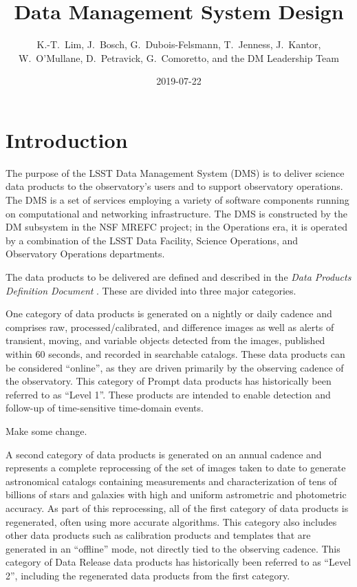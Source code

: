 \documentclass[DM,toc]{lsstdoc}
\title{Data Management System Design}
\author{
  K.-T.~Lim,
  J.~Bosch,
  G.~Dubois-Felsmann,
  T.~Jenness,
  J.~Kantor,
  W.~O'Mullane,
  D.~Petravick,
  G.~Comoretto,
  and
  the DM Leadership Team}
\date{2019-07-22}
\begin{document}
\maketitle

\section{Introduction}\label{introduction}

The purpose of the LSST Data Management System (DMS) is to deliver science data
products to the observatory's users and to support observatory operations.  The
DMS is a set of services employing a variety of software components running on
computational and networking infrastructure.  The DMS is constructed by the DM
subsystem in the NSF MREFC project; in the Operations era, it is operated by a
combination of the LSST Data Facility, Science Operations, and Observatory
Operations departments.

The data products to be delivered are defined and described in the \textit{Data
Products Definition Document} . These are divided into three
major categories.

One category of data products is generated on a nightly or daily cadence
and comprises raw, processed/calibrated, and difference images as well as alerts
of transient, moving, and variable objects detected from the images,
published within 60 seconds, and recorded in searchable catalogs. These
data products can be considered ``online'', as they are driven primarily
by the observing cadence of the observatory. This category of Prompt data products has
historically been referred to as ``Level 1''.  These products are intended to
enable detection and follow-up of time-sensitive time-domain events.

Make some change.

A second category of data products is generated on an annual cadence and
represents a complete reprocessing of the set of images taken to date to
generate astronomical catalogs containing measurements and
characterization of tens of billions of stars and galaxies with high and
uniform astrometric and photometric accuracy. As part of this
reprocessing, all of the first category of data products is regenerated,
often using more accurate algorithms. This category also includes other
data products such as calibration products and templates that are
generated in an ``offline'' mode, not directly tied to the observing
cadence. This category of Data Release data products has historically been referred to as ``Level 2'',
including the regenerated data products from the first category.
\end{document}
